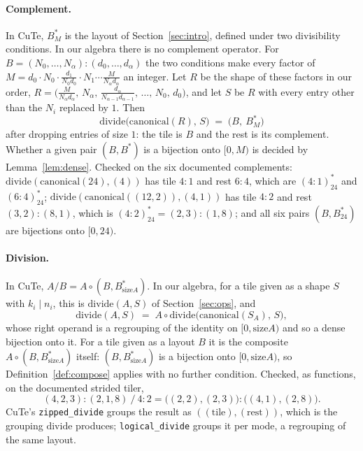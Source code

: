 \documentclass[11pt]{article}
\theoremstyle{definition}
\newcommand{\size}{\mathrm{size}}
\newcommand{\divideop}{\mathrm{divide}}
\begin{document}
\paragraph{Complement.} In CuTe, $B^{*}_{M}$ is the layout of
Section~\ref{sec:intro}, defined under two divisibility conditions. In our
algebra there is no complement operator. For
$B = (N_0,\dots,N_\alpha){:}(d_0,\dots,d_\alpha)$ the two conditions make
every factor of
$M = d_0 \cdot N_0 \cdot \tfrac{d_1}{N_0 d_0} \cdot N_1 \cdots
\tfrac{M}{N_\alpha d_\alpha}$ an integer. Let $R$ be the shape of these
factors in our order,
$R = \big(\tfrac{M}{N_\alpha d_\alpha},\, N_\alpha,\,
\tfrac{d_\alpha}{N_{\alpha-1}d_{\alpha-1}},\, \dots,\, N_0,\, d_0\big)$,
and let $S$ be $R$ with every entry other than the $N_i$ replaced by $1$.
Then
\[
\divideop\big(\mathrm{canonical}(R),\, S\big) \;=\; \big(B,\ B^{*}_{M}\big)
\]
after dropping entries of size $1$: the tile is $B$ and the rest is its
complement. Whether a given pair $(B, B^{*})$ is a bijection onto $[0,M)$ is
decided by Lemma~\ref{lem:dense}. Checked on the six documented complements:
$\divideop(\mathrm{canonical}(24), (4))$ has tile $4{:}1$ and rest $6{:}4$,
which are $(4{:}1)^{*}_{24}$ and $(6{:}4)^{*}_{24}$;
$\divideop(\mathrm{canonical}((12,2)), (4,1))$ has tile $4{:}2$ and rest
$(3,2){:}(8,1)$, which is $(4{:}2)^{*}_{24} = (2,3){:}(1,8)$; and all six
pairs $(B, B^{*}_{24})$ are bijections onto $[0,24)$.

\paragraph{Division.} In CuTe, $A / B = A \circ (B, B^{*}_{\size A})$. In our
algebra, for a tile given as a shape $S$ with $k_i \mid n_i$, this is $\divideop(A,S)$ of
Section~\ref{sec:ops}, and
\[
\divideop(A, S) \;=\; A \circ \divideop\big(\mathrm{canonical}(S_A),\, S\big),
\]
whose right operand is a regrouping of the identity on $[0,\size A)$ and so a
dense bijection onto it. For a tile given as a layout $B$ it is the composite
$A \circ (B, B^{*}_{\size A})$ itself: $(B, B^{*}_{\size A})$ is a bijection
onto $[0,\size A)$, so Definition~\ref{def:compose} applies with no further
condition. Checked, as functions, on the documented strided tiler,
\[
(4,2,3){:}(2,1,8) \mathbin{/} 4{:}2 =
\big((2,2),(2,3)\big){:}\big((4,1),(2,8)\big).
\]
CuTe's
\texttt{zipped\_divide} groups the result as $((\text{tile}),(\text{rest}))$,
which is the grouping $\divideop$ produces; \texttt{logical\_divide} groups
it per mode, a regrouping of the same layout.
\end{document}
